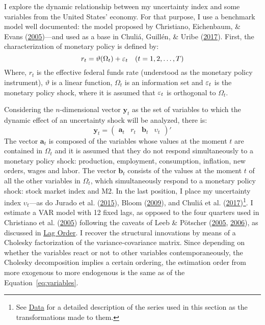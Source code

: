 \documentclass[12pt,twoside]{reedthesis}
\begin{document}
I explore the dynamic relationship between my uncertainty index and some variables from the United States' economy. For that purpose, I use a benchmark model well documented: the model proposed by Christiano, Eichenbaum, \& Evans (\protect\hyperlink{ref-chrietal:2005}{2005})---and used as a base in Chuliá, Guillén, \& Uribe (\protect\hyperlink{ref-chuletal:2017}{2017}). First, the characterization of monetary policy is defined by:
\begin{equation}
    r_{t} = \vartheta (\Omega_{t}) + \varepsilon_{t} \quad (t = 1, 2, \dots, T) \label{eq:R}
\end{equation}
Where, \(r_{t}\) is the effective federal funds rate (understood as the monetary policy instrument), \(\vartheta\) is a linear function, \(\Omega_{t}\) is an information set and \(\varepsilon_{t}\) is the monetary policy shock, where it is assumed that \(\varepsilon_{t}\) is orthogonal to \(\Omega_{t}\).

Considering the \(n\)-dimensional vector \(\bm y_{t}\) as the set of variables to which the dynamic effect of an uncertainty shock will be analyzed, there is:
\begin{equation}
    \bm y_{t} = 
    \begin{pmatrix}
      \bm a_{t} & r_{t} & \bm b_{t} & \upsilon_{t} \label{eq:variables}
    \end{pmatrix}'
\end{equation}
The vector \(\bm a_{t}\) is composed of the variables whose values at the moment \(t\) are contained in \(\Omega_{t}\) and it is assumed that they do not respond simultaneously to a monetary policy shock: production, employment, consumption, inflation, new orders, wages and labor. The vector \(\bm b_{t}\) consists of the values at the moment \(t\) of all the other variables in \(\Omega_{t}\), which simultaneously respond to a monetary policy shock: stock market index and M2. In the last position, I place my uncertainty index \(\upsilon_{t}\)---as do Jurado et al. (\protect\hyperlink{ref-juraetal:2015}{2015}), Bloom (\protect\hyperlink{ref-bloom:2009}{2009}), and Chuliá et al. (\protect\hyperlink{ref-chuletal:2017}{2017})\footnote{See \protect\hyperlink{data}{Data} for a detailed description of the series used in this section as the transformations made to them.}. I estimate a VAR model with 12 fixed lags, as opposed to the four quarters used in Christiano et al. (\protect\hyperlink{ref-chrietal:2005}{2005}) following the caveats of Leeb \& Pötscher (\protect\hyperlink{ref-leebpots:2005}{2005}, \protect\hyperlink{ref-leebpots:2006}{2006}), as discussed in \protect\hyperlink{lag-order}{Lag Order}. I recover the structural innovations by means of a Cholesky factorization of the variance-covariance matrix. Since depending on whether the variables react or not to other variables contemporaneously, the Cholesky decomposition implies a certain ordering, the estimation order from more exogenous to more endogenous is the same as of the Equation~\eqref{eq:variables}.
\end{document}
